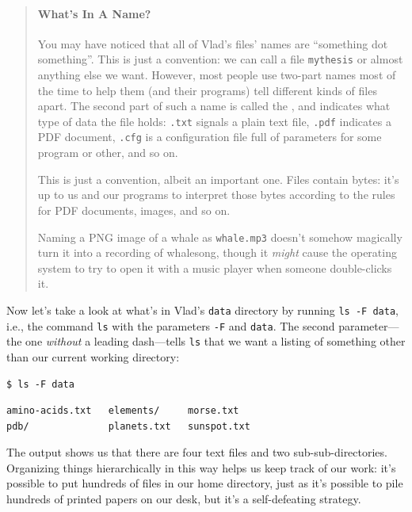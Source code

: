 \documentclass{book}
\begin{document}
\begin{quote}
\mbox{}\paragraph{What's In A Name?}

You may have noticed that all of Vlad's files' names are ``something dot
something''. This is just a convention: we can call a file
\texttt{mythesis} or almost anything else we want. However, most people
use two-part names most of the time to help them (and their programs)
tell different kinds of files apart. The second part of such a name is
called the , and
indicates what type of data the file holds: \texttt{.txt} signals a
plain text file, \texttt{.pdf} indicates a PDF document, \texttt{.cfg}
is a configuration file full of parameters for some program or other,
and so on.

This is just a convention, albeit an important one. Files contain bytes:
it's up to us and our programs to interpret those bytes according to the
rules for PDF documents, images, and so on.

Naming a PNG image of a whale as \texttt{whale.mp3} doesn't somehow
magically turn it into a recording of whalesong, though it \emph{might}
cause the operating system to try to open it with a music player when
someone double-clicks it.
\end{quote}

Now let's take a look at what's in Vlad's \texttt{data} directory by
running \texttt{ls -F data}, i.e., the command \texttt{ls} with the
parameters \texttt{-F} and \texttt{data}. The second parameter---the one
\emph{without} a leading dash---tells \texttt{ls} that we want a listing
of something other than our current working directory:

\begin{verbatim}
$ ls -F data
\end{verbatim}

\begin{verbatim}
amino-acids.txt   elements/     morse.txt
pdb/              planets.txt   sunspot.txt
\end{verbatim}

The output shows us that there are four text files and two
sub-sub-directories. Organizing things hierarchically in this way helps
us keep track of our work: it's possible to put hundreds of files in our
home directory, just as it's possible to pile hundreds of printed papers
on our desk, but it's a self-defeating strategy.
\end{document}
